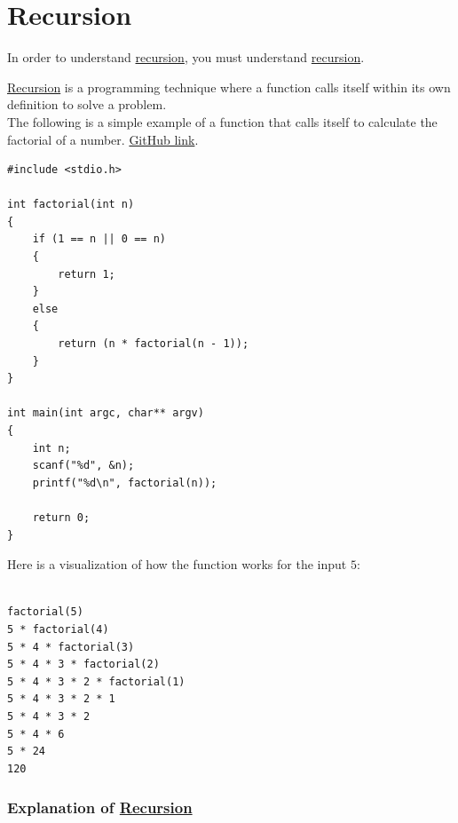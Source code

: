 \documentclass[12pt]{article}
\begin{document}
\tableofcontents

\newpage


\part*{\hypertarget{recursion}{Recursion}} \label{recursion}

\begin{center}
    In order to understand \hyperlink{recursion}{recursion}, you must understand \hyperlink{recursion}{recursion}.
\end{center}

\noindent \hyperlink{recursion}{Recursion} is a programming technique where a function calls itself within its own definition to solve a problem. \\

\noindent The following is a simple example of a function that calls itself to calculate the factorial of a number. \href{https://github.com/stmbsnaasmf/PSPF_Lab_08_Spring_2025/blob/main/factorial.c}{GitHub link}.

\begin{verbatim}
#include <stdio.h>

int factorial(int n)
{
    if (1 == n || 0 == n)
    {
        return 1;
    }
    else
    {
        return (n * factorial(n - 1));
    }
}

int main(int argc, char** argv)
{
    int n;
    scanf("%d", &n);
    printf("%d\n", factorial(n));

    return 0;
}
\end{verbatim}

\newpage

\noindent Here is a visualization of how the function works for the input $5$:

\begin{verbatim}

factorial(5)
5 * factorial(4)
5 * 4 * factorial(3)
5 * 4 * 3 * factorial(2)
5 * 4 * 3 * 2 * factorial(1)
5 * 4 * 3 * 2 * 1
5 * 4 * 3 * 2
5 * 4 * 6
5 * 24
120

\end{verbatim}

\vspace{1cm}

\section*{Explanation of \hyperlink{recursion}{Recursion}}
\end{document}
